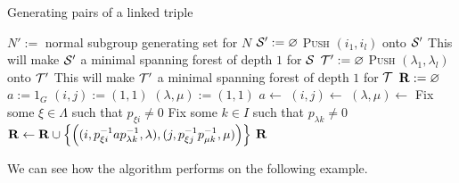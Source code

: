 \begin{algorithm}
\caption{Generating pairs of a linked triple}
\label{alg:linked-triple-to-pairs}
\begin{algorithmic}[1]
    \State $N' := $ normal subgroup generating set for $N$
    \State $\mathcal{S}' := \varnothing$
        \State \textsc{Push} $(i_1, i_l)$ onto $\mathcal{S}'$
        \LComment This will make $\mathcal{S}'$ a minimal spanning forest of depth $1$ for $\mathcal{S}$
      \EndFor
    \EndFor
    \State $\mathcal{T}' := \varnothing$
        \State \textsc{Push} $(\lambda_1, \lambda_l)$ onto $\mathcal{T}'$
        \LComment This will make $\mathcal{T}'$ a minimal spanning forest of depth $1$ for $\mathcal{T}$
      \EndFor
    \EndFor
    \State $\mathbf{R} := \varnothing$
    \State $a := 1_G$
    \State $(i,j) := (1,1)$
    \State $(\lambda,\mu) := (1,1)$
        \State $a \gets$ 
      \EndIf
        \State $(i,j) \gets$ 
      \EndIf
        \State $(\lambda, \mu) \gets$ 
      \EndIf
      \State Fix some $\xi \in \Lambda$ such that $p_{\xi i} \neq 0$
      \State Fix some $k \in I$ such that $p_{\lambda k} \neq 0$
      \State $\mathbf{R} \gets \mathbf{R} \cup \left\{\left(
        (i, p_{\xi i}^{-1}ap_{\lambda k}^{-1}, \lambda),
        (j, p_{\xi j}^{-1}p_{\mu k}^{-1}, \mu)
        \right)\right\}$
    \EndWhile
    \State \Return $\mathbf{R}$
  \EndProcedure
\end{algorithmic}
\end{algorithm}

We can see how the algorithm performs on the following example.

